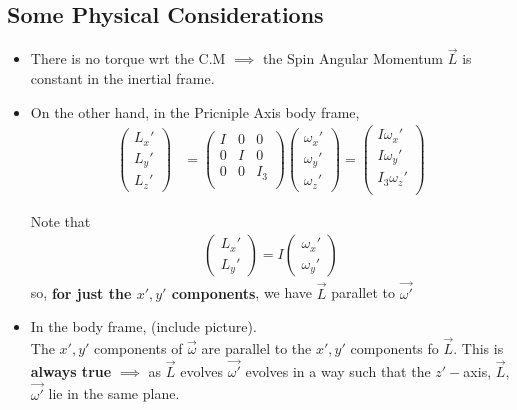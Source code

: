 \documentclass[11pt]{article}
\begin{document}
\subsection{Some Physical Considerations}
\begin{itemize}
  \item There is no torque wrt the C.M $\implies$ the Spin Angular Momentum $\vec{L}$ is constant in the inertial frame.
  \item On the other hand, in the Pricniple Axis body frame, 
  \begin{align*}
    \begin{pmatrix}
      L_x' \\ L_y' \\ L_z'
    \end{pmatrix} &= \begin{pmatrix}
    I & 0 & 0 \\
    0 & I & 0 \\
    0 & 0 & I_3 \\
    \end{pmatrix} \begin{pmatrix}
      \omega_x' \\ \omega_y' \\ \omega_z'
    \end{pmatrix} = \begin{pmatrix}
      I \omega_x' \\
      I \omega_y' \\
      I_3 \omega_z' \\
    \end{pmatrix}
  \end{align*}

  Note that 
  \begin{align*}
    \begin{pmatrix}
      L_x' \\ L_y' 
    \end{pmatrix} = I \begin{pmatrix}
      \omega_x' \\ \omega_y'
    \end{pmatrix}
  \end{align*}
  so, \textbf{for just the $x', y'$ components}, we have $\vec{L}$ parallet to $\vec{\omega'}$
  \\
  \item In the body frame, (include picture).
  \\
  The $x', y'$ components of $\vec{\omega}$ are parallel to the $x', y'$ components fo $\vec{L}$. This is \textbf{always true} $\implies$ as $\vec{L}$ evolves $\vec{\omega'}$ evolves in a way such that the $z'-$axis, $\vec{L}$, $\vec{\omega'}$ lie in the same plane. 
\end{itemize}
\end{document}
